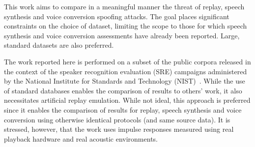 

This work aims to compare in a meaningful manner the threat of replay, speech synthesis and voice conversion spoofing attacks.  The goal places significant constraints on the choice of dataset, limiting the scope to those for which speech synthesis and voice conversion assessments have already been reported.  Large, standard datasets are also preferred.  

The work reported here is performed on a subset of the public corpora released in the context of the speaker recognition evaluation (SRE) campaigns administered by the National Institute for Standards and Technology (NIST)~\cite{NISTSRE2008}.  While the use of standard databases enables the comparison of results to others' work, it also necessitates artificial replay emulation.  While not ideal, this approach is preferred since it enables the comparison of results for replay, speech synthesis and voice conversion using otherwise identical protocols (and same source data).  It is stressed, however, that the work uses impulse responses measured using real playback hardware and real acoustic environments.



